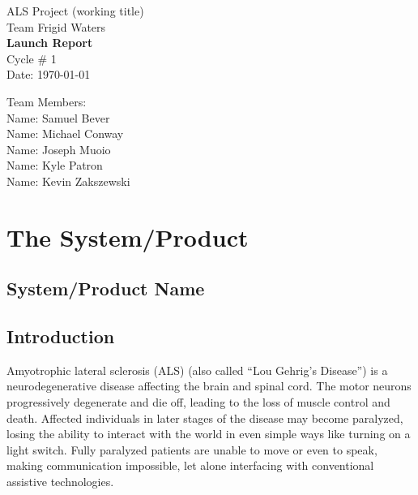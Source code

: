 \documentclass{report}
\begin{document}
\begin{titlepage}
    \begin{center}
        \begin{huge}
        ALS Project (working title) \\[1cm]
        Team Frigid Waters \\[2.2cm]
        { \bfseries Launch Report } \\[1cm]
        Cycle \# 1\\[2.2cm]
        Date: \required\today\\[1cm]
        \end{huge}
    \end{center}
    \null \vfill
    \begin{large}
        Team Members: \\[0.5cm]
        Name: Samuel Bever\\[0.5cm]
        Name: Michael Conway\\[0.5cm]
        Name: Joseph Muoio\\[0.5cm]
        Name: Kyle Patron\\[0.5cm]
        Name: Kevin Zakszewski
    \end{large}
\end{titlepage}

\section*{\centering The System/Product}

\subsection*{System/Product Name}


\subsection*{Introduction}

Amyotrophic lateral sclerosis (ALS) (also called ``Lou Gehrig's Disease'') is
a neurodegenerative disease affecting the brain and spinal cord. The motor
neurons progressively degenerate and die off, leading to the loss of muscle
control and death. Affected individuals in later stages of the disease may
become paralyzed, losing the ability to interact with the world in even simple
ways like turning on a light switch. Fully paralyzed patients are unable to
move or even to speak, making communication impossible, let alone interfacing
with conventional assistive technologies.\cite{ALSsource}
\end{document}
